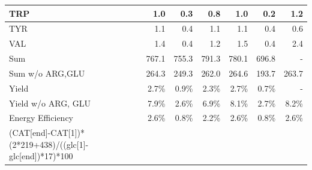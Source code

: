 \documentclass[12pt]{article}
\begin{document}
\begin{table}
\begin{tabular}{lrrrrrr}
        TRP & 1.0 & 0.3 & 0.8 & 1.0 & 0.2 & 1.2 \\ \hline
        TYR & 1.1 & 0.4 & 1.1 & 1.1 & 0.4 & 0.6 \\ \hline
        VAL & 1.4 & 0.4 & 1.2 & 1.5 & 0.4 & 2.4 \\ \midrule
        Sum & 767.1 & 755.3 & 791.3 & 780.1 & 696.8 & - \\ \hline
        Sum w/o ARG,GLU & 264.3 & 249.3 & 262.0 & 264.6 & 193.7 & 263.7 \\ \midrule
        Yield & 2.7\% & 0.9\% & 2.3\% & 2.7\% & 0.7\% & - \\ \hline
        Yield w/o ARG, GLU & 7.9\% & 2.6\% & 6.9\% & 8.1\% & 2.7\% & 8.2\% \\ \midrule
        Energy Efficiency & 2.6\% & 0.8\% & 2.2\% & 2.6\% & 0.8\% & 2.6\% \\ \bottomrule
(CAT[end]-CAT[1])*(2*219+438)/((glc[1]-glc[end])*17)*100

    \end{tabular}
\label{tbl:yield_breakdown}
\end{table}
\end{document}
